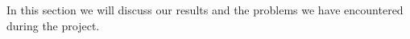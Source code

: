 In this section we will discuss our results and the problems we have encountered during the project.
